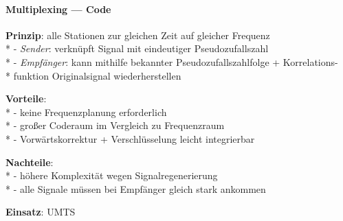 \paragraph{Multiplexing --- Code}
\begin{items}
  \item \textbf{Prinzip}: alle Stationen zur gleichen Zeit auf gleicher Frequenz \\*
    - \emph{Sender}: verknüpft Signal mit eindeutiger Pseudozufallszahl \\*
    - \emph{Empfänger}: kann mithilfe bekannter Pseudozufallszahlfolge + Korrelations- \\* \phantom{-} \phantom{\( \cdot \)} funktion Originalsignal wiederherstellen
  \item \textbf{Vorteile}: \\*
    - keine Frequenzplanung erforderlich \\*
    - großer Coderaum im Vergleich zu Frequenzraum \\*
    - Vorwärtskorrektur + Verschlüsselung leicht integrierbar
  \item \textbf{Nachteile}: \\*
    - höhere Komplexität wegen Signalregenerierung \\*
    - alle Signale müssen bei Empfänger gleich stark ankommen
  \item \textbf{Einsatz}: UMTS
\end{items}

